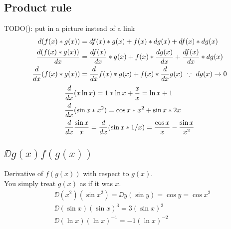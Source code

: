 \documentclass[a4paper,14pt,twoside]{book}
\begin{document}
{\subsection{Product rule}
TODO(): put in a picture instead of a link
\begin{align*}
	d(f(x)*g(x))         &= df(x)*g(x) + f(x)*dg(x) + df(x)*dg(x) \\
	\frac{d(f(x)*g(x))}{dx} &= \frac{df(x)}{dx}*g(x) + f(x)*\frac{dg(x)}{dx} + \frac{df(x)}{dx}*dg(x) \\
	\frac{d}{dx} (f(x)*g(x))       &= \frac{d}{dx} f(x) * g(x) + f(x) * \frac{d}{dx} g(x) \  \because \  dg(x) \to 0 \\
\end{align*}
\begin{align*}
	&\frac{d}{dx} (x \ln x) = 1*\ln x + \frac{x}{x} = \ln x + 1 \\
	&\frac{d}{dx} (\sin{x} * x^2) = \cos{x} * x^2 + \sin{x} * 2x \\
	&\frac{d}{dx} \frac{\sin{x}}{x} = \frac{d}{dx} (\sin{x} * 1/x) = \frac{\cos{x}}{x} - \frac{\sin{x}}{x^2} \\
\end{align*}
\pagebreak
\subsection{$\DD{}{g(x)} f(g(x))$}
Derivative of $f(g(x))$ with respect to $g(x)$. \\
You simply treat $g(x)$ as if it was $x$. \\
\begin{align*}
	&\DD{}{(x^2)} (\sin{x^2}) = \DD{}{y} (\sin{y}) = \cos{y} = \cos{x^2} \\
	&\DD{}{(\sin{x})} (\sin{x})^3 = 3(\sin{x})^2 \\
	&\DD{}{(\ln{x})} (\ln{x})^{-1} = -1(\ln{x})^{-2} \\
\end{align*}
}
\end{document}
